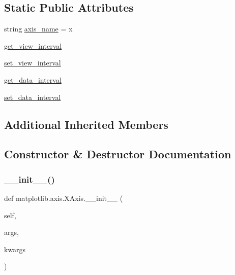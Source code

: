 \subsection*{Static Public Attributes}
\begin{DoxyCompactItemize}
\item 
string \hyperlink{classmatplotlib_1_1axis_1_1XAxis_ad6c67c851f7d7494eb11176885a09fe0}{axis\+\_\+name} = \textquotesingle{}x\textquotesingle{}
\item 
\hyperlink{classmatplotlib_1_1axis_1_1XAxis_addbddee51426eb725780dc897df221ca}{get\+\_\+view\+\_\+interval}
\item 
\hyperlink{classmatplotlib_1_1axis_1_1XAxis_adcb1ad6d5ca1814ff13586c97347b9c2}{set\+\_\+view\+\_\+interval}
\item 
\hyperlink{classmatplotlib_1_1axis_1_1XAxis_a42ad9383252e8fea4811456598a2b419}{get\+\_\+data\+\_\+interval}
\item 
\hyperlink{classmatplotlib_1_1axis_1_1XAxis_a37f810c33cc38bf52304e92991a80053}{set\+\_\+data\+\_\+interval}
\end{DoxyCompactItemize}
\subsection*{Additional Inherited Members}


\subsection{Constructor \& Destructor Documentation}
\mbox{\label{classmatplotlib_1_1axis_1_1XAxis_aaad31e0f415f4761ca51091bd29313c4}} 
\subsubsection{\texorpdfstring{\+\_\+\+\_\+init\+\_\+\+\_\+()}{\_\_init\_\_()}}
{\footnotesize\ttfamily def matplotlib.\+axis.\+X\+Axis.\+\_\+\+\_\+init\+\_\+\+\_\+ (\begin{DoxyParamCaption}\item[{}]{self,  }\item[{}]{args,  }\item[{}]{kwargs }\end{DoxyParamCaption})}



